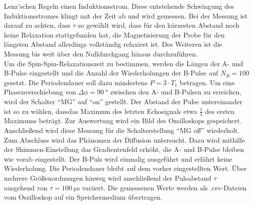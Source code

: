 Lenz'schen Regeln einen Induktionsstrom. Diese entstehende Schwingung des
Induktionsstromes klingt mit der Zeit ab und wird gemessen. Bei der Messung ist
darauf zu achten, dass $\tau$ so gewählt wird, dass für den kürzesten Abstand
noch keine Relaxation stattgefunden hat, die Magnetisierung der Probe für den
längsten Abstand allerdings vollständig relaxiert ist. Des Weiteren ist die
Messung bis weit über den Nulldurchgang hinaus durchzuführen. \\
\noindent Um die Spin-Spin-Relaxationszeit zu bestimmen, werden die Längen der
A- und B-Pulse eingestellt und die Anzahl der Wiederholungen der B-Pulse auf
$N_B = 100$ gesetzt. Die Periodendauer soll dazu mindestens $P = 3 \cdot T_1$
betragen. Um eine Phasenverschiebung von $\Delta \phi = \SI{90}{\degree}$
zwischen den A- und B-Pulsen zu erreichen, wird der Schalter \enquote{MG} auf
\enquote{on} gestellt. Der Abstand der Pulse untereinander ist so zu wählen,
dassdas Maximum des letzten Echosignals etwa $\frac{1}{3}$ des ersten Maximums
beträgt. Zur Auswertung wird ein Bild des Ozsilloskops gespeichert. Anschließend
wird diese Messung für die Schalterstellung \enquote{MG off} wiederholt. \\
\noindent Zum Abschluss wird das Phänomen der Diffusion untersucht. Dazu wird
mithilfe der Shimmen-Einstellung das Gradientenfeld erhöht, die A- und B-Pulse
bleiben wie vorab eingestellt. Der B-Puls wird einmalig ausgeführt und erfährt
keine Wiederholung. Die Periodendauer bleibt auf dem vorher eingestellten Wert.
Über mehrere Größenordnungen hinweg wird anschließend der Pulsabstand $\tau$
ausgehend von $\tau = \SI{100}{\micro\second}$ variiert. Die gemessenen Werte
werden als .csv-Dateien vom Oszilloskop auf ein Speichermedium übertragen.  
